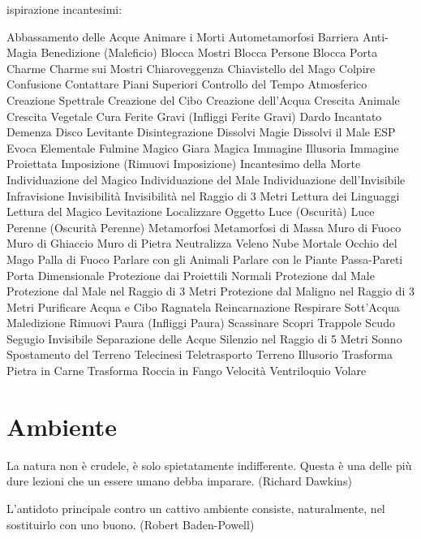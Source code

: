 \documentclass[12pt,a4paper,twoside,openany]{book}
\begin{document}
\begin{multicols}{2}
ispirazione incantesimi:

Abbassamento delle Acque
Animare i Morti
Autometamorfosi
Barriera Anti-Magia
Benedizione (Maleficio)
Blocca Mostri
Blocca Persone
Blocca Porta
Charme
Charme sui Mostri
Chiaroveggenza
Chiavistello del Mago
Colpire
Confusione
Contattare Piani Superiori
Controllo del Tempo Atmosferico
Creazione Spettrale
Creazione del Cibo
Creazione dell’Acqua
Crescita Animale
Crescita Vegetale
Cura Ferite Gravi (Infliggi Ferite Gravi)
Dardo Incantato
Demenza
Disco Levitante
Disintegrazione
Dissolvi Magie
Dissolvi il Male
ESP
Evoca Elementale
Fulmine Magico
Giara Magica
Immagine Illusoria
Immagine Proiettata
Imposizione (Rimuovi Imposizione)
Incantesimo della Morte
Individuazione del Magico
Individuazione del Male
Individuazione dell'Invisibile
Infravisione
Invisibilità
Invisibilità nel Raggio di 3 Metri
Lettura dei Linguaggi
Lettura del Magico
Levitazione
Localizzare Oggetto
Luce (Oscurità)
Luce Perenne (Oscurità Perenne)
Metamorfosi
Metamorfosi di Massa
Muro di Fuoco
Muro di Ghiaccio
Muro di Pietra
Neutralizza Veleno
Nube Mortale
Occhio del Mago
Palla di Fuoco
Parlare con gli Animali
Parlare con le Piante
Passa-Pareti
Porta Dimensionale
Protezione dai Proiettili Normali
Protezione dal Male
Protezione dal Male nel Raggio di 3 Metri
Protezione dal Maligno nel Raggio di 3 Metri
Purificare Acqua e Cibo
Ragnatela
Reincarnazione
Respirare Sott’Acqua
Maledizione
Rimuovi Paura (Infliggi Paura)
Scassinare
Scopri Trappole
Scudo
Segugio Invisibile
Separazione delle Acque
Silenzio nel Raggio di 5 Metri
Sonno
Spostamento del Terreno
Telecinesi
Teletrasporto
Terreno Illusorio
Trasforma Pietra in Carne
Trasforma Roccia in Fango
Velocità
Ventriloquio
Volare



\end{multicols}

\pagebreak

\section{Ambiente}

\label{ambiente}
\begin{changemargin}{0.3cm}{0.3cm}\begin{enfasi}{
La natura non è crudele, è solo spietatamente indifferente. Questa è una delle più dure lezioni che un essere umano debba imparare. (Richard Dawkins)
	
	\medskip
	
L'antidoto principale contro un cattivo ambiente consiste, naturalmente, nel sostituirlo con uno buono. (Robert Baden-Powell)}\end{enfasi}\end{changemargin}\medskip
\end{document}

